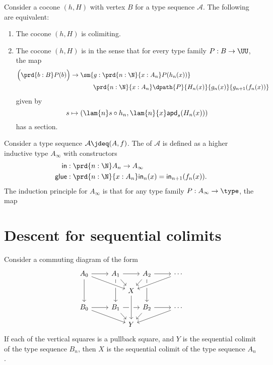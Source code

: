 \begin{thm}
Consider a cocone $(h,H)$ with vertex $B$ for a type sequence $\mathcal{A}$. The following are equivalent:
\begin{enumerate}
\item The cocone $(h,H)$ is colimiting.
\item The cocone $(h,H)$ is  in the sense that for every type family $P:B\to \UU$, the map
\begin{align*}
\Big(\prd{b:B}P(b)\Big)\to {}& \sm{g:\prd{n:\N}{x:A_n}P(h_n(x))}\\ 
& \qquad \prd{n:\N}{x:A_n} \dpath{P}{H_n(x)}{g_n(x)}{g_{n+1}(f_n(x))}
\end{align*}
given by
\begin{equation*}
s\mapsto (\lam{n}s\circ h_n,\lam{n}{x} \mathsf{apd}_{s}(H_n(x)))
\end{equation*}
has a section.
\end{enumerate}
\end{thm}

\begin{defn}
Consider a type sequence $\mathcal{A}\jdeq (A,f)$. The  of $\mathcal{A}$ is defined as a higher inductive type $A_\infty$ with constructors
\begin{align*}
\mathsf{in} & : \prd{n:\N} A_n\to A_\infty \\
\mathsf{glue} & : \prd{n:\N}{x:A_n} \mathsf{in}_n(x)=\mathsf{in}_{n+1}(f_n(x)).
\end{align*}
The induction principle for $A_\infty$ is that for any type family $P:A_\infty\to\type$, the map

\end{defn}

\section{Descent for sequential colimits}
\begin{thm}
Consider a commuting diagram of the form
\begin{equation*}
\begin{tikzcd}[column sep=small,row sep=small]
A_0 \arrow[rr] \arrow[dd] & & A_1 \arrow[rr] \arrow[dr] \arrow[dd] &[-.9em] &[-.9em] A_2 \arrow[dl] \arrow[dd] & & \cdots \\
& & & X \arrow[from=ulll,crossing over] \arrow[from=urrr,crossing over] \arrow[from=ur,to=urrr] \\
B_0 \arrow[rr] \arrow[drrr] & & B_1 \arrow[rr] \arrow[dr] & & B_2 \arrow[rr] \arrow[dl] & & \cdots \arrow[dlll] \\
& & & Y \arrow[from=uu,crossing over] 
\end{tikzcd}
\end{equation*}
If each of the vertical squares is a pullback square, and $Y$ is the sequential colimit of the type sequence $B_n$, then $X$ is the sequential colimit of the type sequence $A_n$. 
\end{thm}

